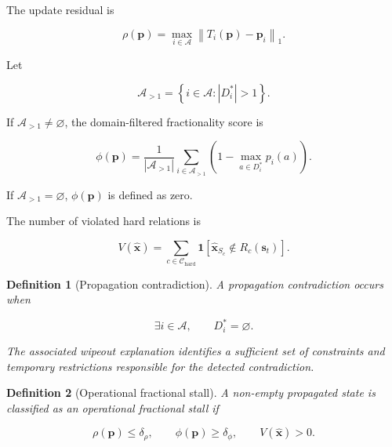 \documentclass[pdflatex,sn-mathphys-num,iicol,oneside]{sn-jnl}
\newtheorem{definition}{Definition}
\begin{document}
The update residual is

\begin{equation}
\rho(\bm{p})
=
\max_{i\in\mathcal{A}}
\left\|
T_i(\bm{p})-\bm{p}_i
\right\|_1.
\label{eq:residual}
\end{equation}

Let

\begin{equation}
\mathcal{A}_{>1}
=
\left\{
i\in\mathcal{A}:|D_i^{*}|>1
\right\}.
\end{equation}

If $\mathcal{A}_{>1}\neq\varnothing$, the domain-filtered
fractionality score is

\begin{equation}
\phi(\bm{p})
=
\frac{1}{|\mathcal{A}_{>1}|}
\sum_{i\in\mathcal{A}_{>1}}
\left(
1-\max_{a\in D_i^{*}}p_i(a)
\right).
\label{eq:fractionality}
\end{equation}

If $\mathcal{A}_{>1}=\varnothing$, $\phi(\bm{p})$ is defined as zero.

The number of violated hard relations is

\begin{equation}
V(\widehat{\bm{x}})
=
\sum_{c\in\mathcal{C}_{\mathrm{hard}}}
\mathbf{1}
\left[
\widehat{\bm{x}}_{S_c}
\notin R_c(\bm{s}_t)
\right].
\label{eq:violations}
\end{equation}

\begin{definition}[Propagation contradiction]
A propagation contradiction occurs when

\begin{equation}
\exists i\in\mathcal{A},
\qquad
D_i^{*}=\varnothing.
\end{equation}

The associated wipeout explanation identifies a sufficient set of
constraints and temporary restrictions responsible for the detected
contradiction.
\end{definition}

\begin{definition}[Operational fractional stall]
A non-empty propagated state is classified as an operational
fractional stall if

\begin{equation}
\rho(\bm{p})\leq\delta_{\rho},
\qquad
\phi(\bm{p})\geq\delta_{\phi},
\qquad
V(\widehat{\bm{x}})>0.
\end{equation}
\end{definition}
\end{document}
